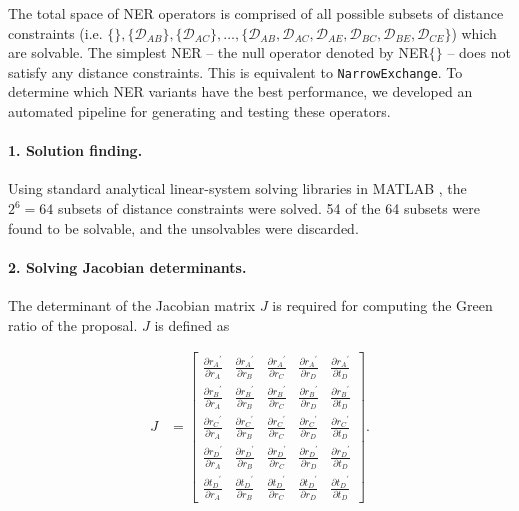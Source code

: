 \documentclass[10pt,letterpaper]{article}
\begin{document}
The total space of NER operators is comprised of all possible subsets of distance constraints (i.e. $\{\},\{\mathcal{D}_{AB}\}, \{\mathcal{D}_{AC}\}, \dotso , \{\mathcal{D}_{AB}, \mathcal{D}_{AC}, \mathcal{D}_{AE}, \mathcal{D}_{BC}, \mathcal{D}_{BE}, \mathcal{D}_{CE} \}$) which are solvable. 
The simplest NER -- the null operator denoted by NER$\{\}$ -- does not satisfy any distance constraints. 
This is equivalent to \texttt{NarrowExchange}. 
To determine which NER variants have the best performance, we developed an automated pipeline for generating and testing these operators.


\paragraph{1. Solution finding.} Using standard analytical linear-system solving libraries in MATLAB \cite{higham2016matlab}, the $2^6=64$ subsets of distance constraints were solved. 54 of the 64 subsets were found to be solvable, and the unsolvables were discarded.


\paragraph{2. Solving Jacobian determinants.} The determinant of the Jacobian matrix $J$ is required for computing the Green ratio of the proposal. $J$ is defined as 


\begin{align}
	J &= \begin{bmatrix} \frac{\partial {r_A}^\prime}{\partial r_A} & \frac{\partial {r_A}^\prime}{\partial r_B} & \frac{\partial {r_A}^\prime}{\partial r_C} & \frac{\partial {r_A}^\prime}{\partial r_D} & \frac{\partial {r_A}^\prime}{\partial t_D} \\
	\frac{\partial {r_B}^\prime}{\partial r_A} & \frac{\partial {r_B}^\prime}{\partial r_B} & \frac{\partial {r_B}^\prime}{\partial r_C} & \frac{\partial {r_B}^\prime}{\partial r_D} & \frac{\partial {r_B}^\prime}{\partial t_D} \\
	\frac{\partial {r_C}^\prime}{\partial r_A} & \frac{\partial {r_C}^\prime}{\partial r_B} & \frac{\partial {r_C}^\prime}{\partial r_C} & \frac{\partial {r_C}^\prime}{\partial r_D} & \frac{\partial {r_C}^\prime}{\partial t_D} \\
	\frac{\partial {r_D}^\prime}{\partial r_A} & \frac{\partial {r_D}^\prime}{\partial r_B} & \frac{\partial {r_D}^\prime}{\partial r_C} & \frac{\partial {r_D}^\prime}{\partial r_D} & \frac{\partial {r_D}^\prime}{\partial t_D} \\
\frac{\partial {t_D}^\prime}{\partial r_A} & \frac{\partial {t_D}^\prime}{\partial r_B} & \frac{\partial {t_D}^\prime}{\partial r_C} & \frac{\partial {t_D}^\prime}{\partial r_D} & \frac{\partial {t_D}^\prime}{\partial t_D}\end{bmatrix}.  \nonumber  \\
\end{align}
\end{document}
